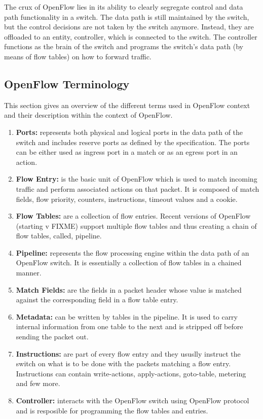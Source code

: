 \documentclass[a4paper]{article}
\begin{document}
The crux of OpenFlow lies in its ability to clearly segregate control and data path functionality in a switch. The data path is still maintained by the switch, but the control decisions are not taken by the switch anymore. Instead, they are offloaded to an entity, controller, which is connected to the switch. The controller functions as the brain of the switch and programs the switch's data path (by means of flow tables) on how to forward traffic. 

\subsection{OpenFlow Terminology}
This section gives an overview of the different terms used in OpenFlow context and their description within the context of OpenFlow.

\begin{enumerate}
\item \textbf{Ports:} represents both physical and logical ports in the data path of the switch and includes reserve ports as defined by the specification. The ports can be either used as ingress port in a match or as an egress port in an action.
\item \textbf{Flow Entry:} is the basic unit of OpenFlow which is used to match incoming traffic and perform associated actions on that packet. It is composed of match fields, flow priority, counters, instructions, timeout values and a cookie.
\item \textbf{Flow Tables:} are a collection of flow entries. Recent versions of OpenFlow (starting v FIXME) support multiple flow tables and thus creating a chain of flow tables, called, pipeline.
\item \textbf{Pipeline:} represents the flow processing engine within the data path of an OpenFlow switch. It is essentially a collection of flow tables in a chained manner.
\item \textbf{Match Fields:} are the fields in a packet header whose value is matched against the corresponding field in a flow table entry. 
\item \textbf{Metadata:} can be written by tables in the pipeline. It is used to carry internal information from one table to the next and is stripped off before sending the packet out.
\item \textbf{Instructions: } are part of every flow entry and they ususlly instruct the switch on what is to be done with the packets matching a flow entry. Instructions can contain write-actions, apply-actions, goto-table, metering and few more.
\item \textbf{Controller:} interacts with the OpenFlow switch using OpenFlow protocol and is resposible for programming the flow tables and entries.
\end{enumerate}
\end{document}
